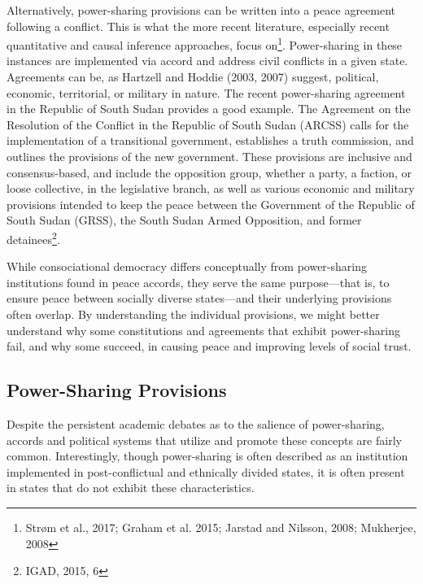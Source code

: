 \documentclass[12pt]{article}
\begin{document}
Alternatively, power-sharing provisions can be written into a peace agreement following a conflict. This is what the more recent literature, especially recent quantitative and causal inference approaches, focus on\footnote{Strøm et al., 2017; Graham et al. 2015; Jarstad and Nilsson, 2008; Mukherjee, 2008}. Power-sharing in these instances are implemented via accord and address civil conflicts in a given state. Agreements can be, as Hartzell and Hoddie (2003, 2007) suggest, political, economic, territorial, or military in nature. The recent power-sharing agreement in the Republic of South Sudan provides a good example. The Agreement on the Resolution of the Conflict in the Republic of South Sudan (ARCSS) calls for the implementation of a transitional government, establishes a truth commission, and outlines the provisions of the new government. These provisions are inclusive and consensus-based, and include the opposition group, whether a party, a faction, or loose collective, in the legislative branch, as well as various economic and military provisions intended to keep the peace between the Government of the Republic of South Sudan (GRSS), the South Sudan Armed Opposition, and former detainees\footnote{IGAD, 2015, 6}. 

While consociational democracy differs conceptually from power-sharing institutions found in peace accords, they serve the same purpose—that is, to ensure peace between socially diverse states—and their underlying provisions often overlap. By understanding the individual provisions, we might better understand why some constitutions and agreements that exhibit power-sharing fail, and why some succeed, in causing peace and improving levels of social trust. 

\subsection{Power-Sharing Provisions}
Despite the persistent academic debates as to the salience of power-sharing, accords and political systems that utilize and promote these concepts are fairly common. Interestingly, though power-sharing is often described as an institution implemented in post-conflictual and ethnically divided states, it is often present in states that do not exhibit these characteristics. 
\end{document}
